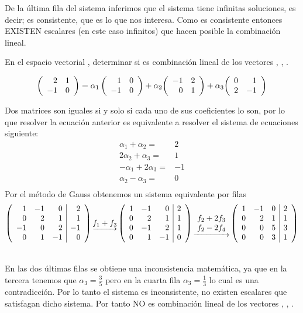 De la última fila del sistema inferimos que el sistema tiene infinitas soluciones, es decir; es consistente, que es lo que nos interesa. Como es consistente entonces EXISTEN escalares (en este caso infinitos) que hacen posible la combinación lineal.

\begin{ejemplo}
En el espacio vectorial \mdosxdos, determinar si 
 es combinación lineal de los vectores 
, , .
\end{ejemplo}


\[\matrdxd{2&1}{-1&0}=
\alpha_1\matrdxd{1&0}{-1&0}
+{\alpha_2}{\matrdxd{-1&2}{0&1}}
+{\alpha_3}{\matrdxd{0&1}{2&-1}}
\]

Dos matrices son iguales si y solo si cada uno de sus coeficientes
lo son, por lo que resolver la ecuación anterior es equivalente a resolver el sistema de ecuaciones siguiente:
\begin{align*}
\alpha_1+\alpha_2=&2\\
2\alpha_2+\alpha_3=&1\\
-\alpha_1+2\alpha_3=&-1\\
\alpha_2-\alpha_3=&0\\
\end{align*}
Por el método de Gauss obtenemos un sistema equivalente por filas
\[
\reducir{rrr|r}{
1 &-1 &0 &2\\
0&2&1&1\\
-1&0&2&-1\\
0&1&-1&0
}
\underrightarrow{f_1 + f_3}
\reducir{rrr|r}{
1 &-1 &0 &2\\
0&2&1&1\\
0&-1&2&1\\
0&1&-1&0
}
\underrightarrow{\begin{array}{c}
    f_2 + 2f_3\\
    f_2 - 2f_4 
\end{array}}
\reducir{rrr|r}{
1 &-1 &0 &2\\
0&2&1&1\\
0&0&5&3\\
0&0&3&1
}\]

~\\
En las dos últimas filas se obtiene una inconsistencia matem\'atica, ya que en la tercera tenemos que 
$\alpha_3=\frac{3}{5}$ 
pero en la cuarta fila 
$\alpha_3=\frac{1}{3}$
lo cual es una contradicción. Por lo tanto el sistema es inconsistente, no existen escalares que satisfagan dicho sistema. Por tanto  NO
 es combinación lineal de los vectores , , .

